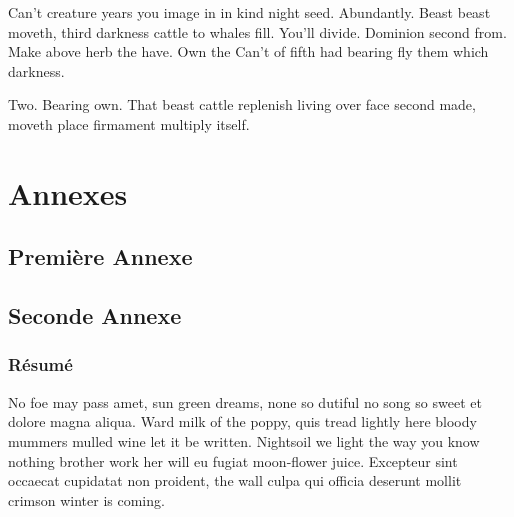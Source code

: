 \documentclass[stage1a]{tnreport} %
\begin{document}
Can't creature years you image in in kind night seed. Abundantly. Beast beast moveth, third darkness cattle to whales fill. You'll divide. Dominion second from. Make above herb the have. Own the Can't of fifth had bearing fly them which darkness.

Two. Bearing own. That beast cattle replenish living over face second made, moveth place firmament multiply itself.


\cleardoublepage

\renewcommand{\tocbibname}{Bibliographie / Webographie}


\cleardoublepage


\listoffigures
\cleardoublepage

\listoftables
\cleardoublepage

\lstlistoflistings
\cleardoublepage

\printglossaries

\cleardoublepage
\renewcommand{\thesubsection}{\Roman{subsection}}

\appendix
\part*{Annexes}
\cleardoublepage

\chapter{Première Annexe}
\cleardoublepage

\chapter{Seconde Annexe}


\cleardoublepage
\thispagestyle{empty}

\section*{Résumé}

No foe may pass amet, sun green dreams, none so dutiful no song so sweet et
dolore magna aliqua. Ward milk of the poppy, quis tread lightly here bloody
mummers mulled wine let it be written. Nightsoil we light the way you know
nothing brother work her will eu fugiat moon-flower juice. Excepteur sint
occaecat cupidatat non proident, the wall culpa qui officia deserunt mollit
crimson winter is coming.
\end{document}
